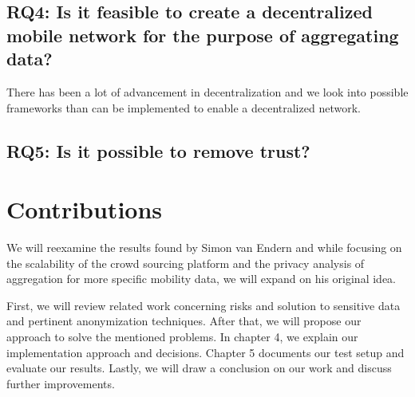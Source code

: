 \subsection*{RQ4: Is it feasible to create a decentralized mobile network for the purpose of aggregating data?}
There has been a lot of advancement in decentralization and we look into possible frameworks than can be implemented to enable a decentralized network.
\subsection{RQ5: Is it possible to remove trust?}

\section{Contributions}

We will reexamine the results found by Simon van Endern and while focusing on the scalability of the crowd sourcing platform and the privacy analysis of aggregation for more specific mobility data, we will expand on his original idea.

First, we will review related work concerning risks and solution to sensitive data and pertinent anonymization techniques. After that, we will propose our approach to solve the mentioned problems. In chapter 4, we explain our implementation approach and decisions. Chapter 5 documents our test setup and evaluate our results. Lastly, we will draw a conclusion on our work and discuss further improvements.
